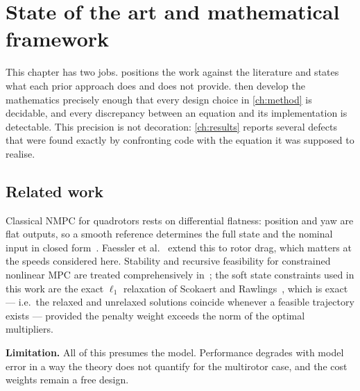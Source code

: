\documentclass[11pt,a4paper,twoside,openright]{report}
\makeatletter
\renewcommand{\subsection}{\FloatBarrier\old@subsection}}
\theoremstyle{plain}
\theoremstyle{definition}
\theoremstyle{remark}
\makeatother
\begin{document}
	\chapter{State of the art and mathematical framework}
	\label{ch:sota}

	This chapter has two jobs.  positions the work against the
	literature and states what each prior approach does and does not provide.
	 then develop the mathematics precisely
	enough that every design choice in \cref{ch:method} is decidable, and every
	discrepancy between an equation and its implementation is detectable. This
	precision is not decoration: \cref{ch:results} reports several defects that were
	found exactly by confronting code with the equation it was supposed to realise.

	\section{Related work}
	\label{sec:sota}

	\subsection{Predictive control of multirotors}

	Classical NMPC for quadrotors rests on differential flatness: position and yaw
	are flat outputs, so a smooth reference determines the full state and the
	nominal input in closed form~\cite{mellinger2011minimum}. Faessler et
	al.~\cite{faessler2018differential} extend this to rotor drag, which matters at
	the speeds considered here. Stability and recursive feasibility for constrained
	nonlinear MPC are treated comprehensively in~\cite{mayne2000constrained,
		rawlings2017mpc}; the soft state constraints used in this work are the exact
	$\ell_1$ relaxation of Scokaert and Rawlings~\cite{scokaert1999feasibility},
	which is exact --- i.e.\ the relaxed and unrelaxed solutions coincide whenever a
	feasible trajectory exists --- provided the penalty weight exceeds the norm of
	the optimal multipliers.

	\textbf{Limitation.} All of this presumes the model. Performance degrades with
	model error in a way the theory does not quantify for the multirotor case, and
	the cost weights remain a free design.
\end{document}
